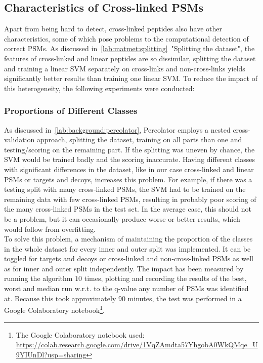 \subsection{Characteristics of Cross-linked PSMs}
Apart from being hard to detect, cross-linked peptides also have other characteristics, some of which pose problems to the computational detection of correct PSMs. As discussed in~\ref{lab:matmet:splitting}~"Splitting the dataset", the features of cross-linked and linear peptides are so dissimilar, splitting the dataset and training a linear SVM separately on cross-links and non-cross-links yields significantly better results than training one linear SVM. To reduce the impact of this heterogeneity, the following experiments were conducted:
\subsubsection{Proportions of Different Classes}
\label{lab:matmet:proportions}
As discussed in~\ref{lab:background:percolator}, Percolator employs a nested cross-validation approach, splitting the dataset, training on all parts than one and testing/scoring on the remaining part. If the splitting was uneven by chance, the SVM would be trained badly and the scoring inaccurate. Having different classes with significant differences in the dataset, like in our case cross-linked and linear PSMs or targets and decoys, increases this problem. For example, if there was a testing split with many cross-linked PSMs, the SVM had to be trained on the remaining data with few cross-linked PSMs, resulting in probably poor scoring of the many cross-linked PSMs in the test set. In the average case, this should not be a problem, but it can occasionally produce worse or better results, which would follow from overfitting.\\
To solve this problem, a mechanism of maintaining the proportion of the classes in the whole dataset for every inner and outer split was implemented. It can be toggled for targets and decoys or cross-linked and non-cross-linked PSMs as well as for inner and outer split independently. The impact has been measured by running the algorithm $10$ times, plotting and recording the results of the best, worst and median run w.r.t. to the q-value any number of PSMs was identified at. Because this took approximately 90 minutes, the test was performed in a Google Colaboratory notebook\footnote{The Google Colaboratory notebook used:\\ \url{https://colab.research.google.com/drive/1VqZAmdta57YhgobA0WkQMqe_U9YIUnDl?usp=sharing}}.
